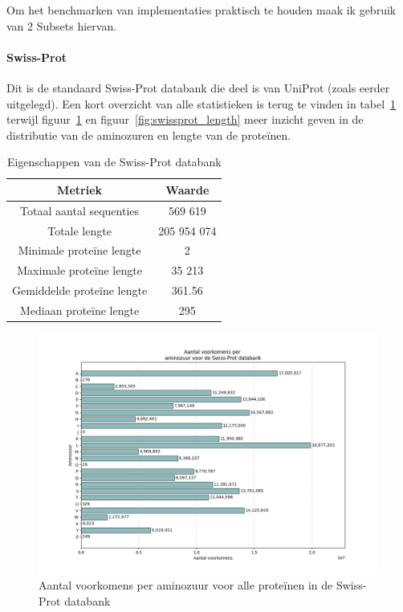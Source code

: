 \documentclass[11pt,dutch,faculty=we,layout=titlefont,underline=false,titleUppercase=true,titleUnderline=true]{ugent2016-report}
\begin{document}
    Om het benchmarken van implementaties praktisch te houden maak ik gebruik van 2 Subsets hiervan.

    \paragraph{Swiss-Prot} Dit is de standaard Swiss-Prot databank die deel is van UniProt (zoals eerder uitgelegd).
    Een kort overzicht van alle statistieken is terug te vinden in tabel~\ref{tab:swissprot_eigenschappen} terwijl figuur~\ref{fig:swissprot_aminozuur} en figuur~\ref{fig:swissprot_length} meer inzicht geven in de distributie van de aminozuren en lengte van de proteïnen.

    \begin{table}[h!]
        \centering
        \begin{tabular}{c c}
            Metriek                    & Waarde      \\
            \hline\hline
            Totaal aantal sequenties   & 569 619     \\
            Totale lengte              & 205 954 074 \\
            Minimale proteïne lengte   & 2           \\
            Maximale proteïne lengte   & 35 213      \\
            Gemiddelde proteïne lengte & 361.56      \\
            Mediaan proteïne lengte    & 295         \\
            \hline
        \end{tabular}
        \caption{Eigenschappen van de Swiss-Prot databank}
        \label{tab:swissprot_eigenschappen}
    \end{table}


    \begin{figure}[H]
        \centering
        \includegraphics[width=0.7\linewidth]{swissprot_aminozuur_voorkomens}
        \caption{Aantal voorkomens per aminozuur voor alle proteïnen in de Swiss-Prot databank}
        \label{fig:swissprot_aminozuur}
    \end{figure}
\end{document}

